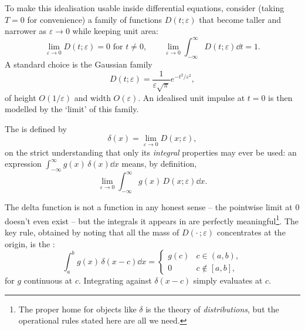 \documentclass[a4paper]{scrartcl}
\begin{document}
To make this idealisation usable inside differential equations, consider (taking $T = 0$ for convenience) a family of functions $D(t; \varepsilon)$ that become taller and narrower as $\varepsilon \to 0$ while keeping unit area:
$$
\lim_{\varepsilon \to 0} D(t;\varepsilon) = 0 \text{ for } t \neq 0, \qquad \lim_{\varepsilon \to 0} \int_{-\infty}^{\infty} D(t; \varepsilon) \dd t = 1.
$$
A standard choice is the Gaussian family
$$
D(t; \varepsilon) = \frac{1}{\varepsilon \sqrt \pi} e^{-t^2/\varepsilon^2},
$$
of height $O(1/\varepsilon)$ and width $O(\varepsilon)$. An idealised unit impulse at $t = 0$ is then modelled by the `limit' of this family.

\begin{center}
\end{center}

\begin{definition}
	The  is defined by
	$$
	\delta(x) = \lim_{\varepsilon \to 0} D(x; \varepsilon),
	$$
	on the strict understanding that only its \emph{integral} properties may ever be used: an expression $\int_{-\infty}^{\infty} g(x)\, \delta(x) \dd x$ means, by definition,
	$$
	\lim_{\varepsilon \to 0} \int_{-\infty}^\infty g(x) \, D(x; \varepsilon) \dd x.
	$$
\end{definition}

The delta function is not a function in any honest sense -- the pointwise limit at $0$ doesn't even exist -- but the integrals it appears in are perfectly meaningful\footnote{The proper home for objects like $\delta$ is the theory of \emph{distributions}, but the operational rules stated here are all we need.}. The key rule, obtained by noting that all the mass of $D(\cdot\,; \varepsilon)$ concentrates at the origin, is the :
$$
\int_a^b g(x) \, \delta(x - c) \dd x = \begin{cases} g(c) & c \in (a, b), \\ 0 & c \notin [a, b], \end{cases}
$$
for $g$ continuous at $c$. Integrating against $\delta(x - c)$ simply evaluates at $c$.
\end{document}
